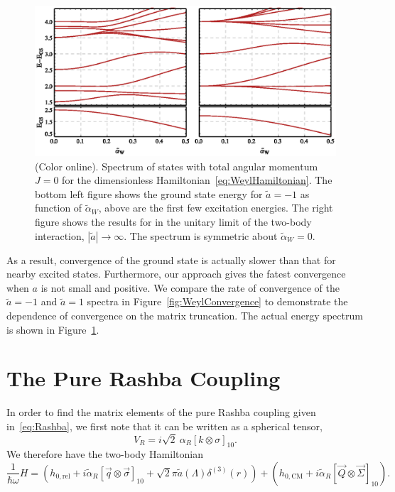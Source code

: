 \documentclass[%
 notitlepage,
 preprint,
showpacs,%
 amsmath,amssymb,
 aps,
pra,
]{revtex4-1}
\begin{document}
\begin{figure}
\includegraphics{Figures/WeylSpectrum}
\caption{\label{fig:WeylSpectrum}(Color online).  Spectrum of states with total angular momentum $J=0$ for the dimensionless Hamiltonian~\eqref{eq:WeylHamiltonian}. The bottom left figure shows the ground state energy for $\tilde{a}=-1$ as function of $\tilde{\alpha}_W$, above are the first few excitation energies. The right figure shows the results for in the unitary limit of the two-body interaction, $|\tilde{a}|\rightarrow\infty$. The spectrum is symmetric about $\tilde{\alpha}_W=0$.} 
\end{figure}

As a result, convergence of the ground state is actually slower than that for nearby excited states. Furthermore, our approach gives the fatest convergence when $a$ is not small and positive. We compare the rate of convergence of the $\tilde{a}=-1$ and $\tilde{a}=1$ spectra in Figure~\ref{fig:WeylConvergence} to demonstrate the dependence of convergence on the matrix truncation. The actual energy spectrum is shown in Figure~\ref{fig:WeylSpectrum}. 

\section{\label{sec:Rashba}The Pure Rashba Coupling}

In order to find the matrix elements of the pure Rashba coupling given in~\eqref{eq:Rashba}, we first note that it can be written as a spherical tensor,
\begin{equation}
V_{R}=i\sqrt{2}\:\alpha_R \left[ k \otimes \sigma \right]_{10}.
\end{equation}
We therefore have the two-body Hamiltonian
\begin{equation}\label{eq:RashbaHamiltonian}
\frac{1}{\hbar\omega}H=\left(h_{0,\text{rel}}+i \tilde{\alpha}_R  \left[ \vec{q} \otimes \vec{\sigma} \right]_{10} + \sqrt{2}\pi \tilde{a}(\Lambda) \delta^{(3)}(r)\right)+\left(h_{0,\text{CM}}+i \tilde{\alpha}_R [ \vec{Q}\otimes \vec{\Sigma} ]_{10} \right).
\end{equation}
\end{document}

